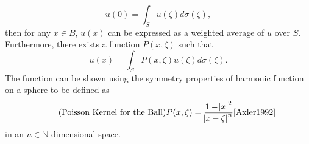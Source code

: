   \begin{equation}
     u(0) = \int_{S}u(\zeta)d\sigma(\zeta),
     \label{eq:centerval}
    \end{equation}
  then for any $x \in B\text{, }u(x)$ can be expressed as a weighted average of
  $u$ over $S$. Furthermore, there exists a function $P(x,\zeta)$ such that
  \begin{equation}u(x)=\int_{S}P(x,\zeta)u(\zeta)d\sigma(\zeta).\label{eq:weighted_average_integral} \end{equation}
     The function can be shown
  using the symmetry properties of harmonic function on a sphere to be defined as
  \begin{equation}
    \tag{Poisson Kernel for the Ball}
    P(x,\zeta) = \frac{1 - \abs{x}^{2}}{\abs{x- \zeta}^{n}}
    \label{eq:poissonkernel}
    \cite{Axler1992}
  \end{equation}
  in an $n \in \mathbb{N}$ dimensional space.

